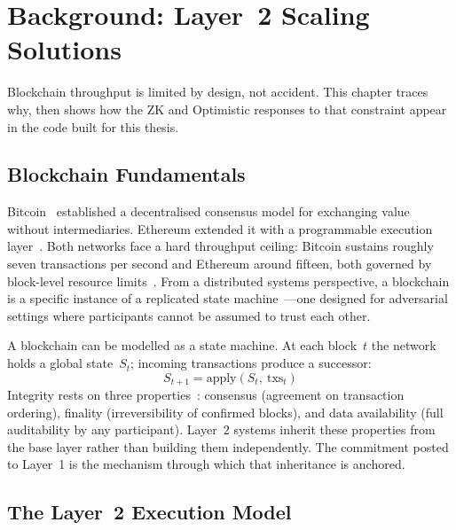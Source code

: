 \chapter{Background: Layer~2 Scaling Solutions}
\label{ch:background}

Blockchain throughput is limited by design, not accident. This chapter traces why, then shows how the ZK and Optimistic responses to that constraint appear in the code built for this thesis.

\section{Blockchain Fundamentals}
\label{sec:fundamentals}

Bitcoin~\cite{nakamoto2008bitcoin} established a decentralised consensus model for exchanging value without intermediaries. Ethereum extended it with a programmable execution layer~\cite{wood2014ethereum}. Both networks face a hard throughput ceiling: Bitcoin sustains roughly seven transactions per second and Ethereum around fifteen, both governed by block-level resource limits~\cite{croman2016scaling}. From a distributed systems perspective, a blockchain is a specific instance of a replicated state machine~\cite{vansteen2023distributed}---one designed for adversarial settings where participants cannot be assumed to trust each other.

A blockchain can be modelled as a state machine. At each block~$t$ the network holds a global state~$S_t$; incoming transactions produce a successor:
\begin{equation}
  S_{t+1} = \text{apply}(S_t,\ \text{txs}_t)
\end{equation}
Integrity rests on three properties~\cite{vansteen2023distributed}: consensus (agreement on transaction ordering), finality (irreversibility of confirmed blocks), and data availability (full auditability by any participant). Layer~2 systems inherit these properties from the base layer rather than building them independently. The commitment posted to Layer~1 is the mechanism through which that inheritance is anchored.

\section{The Layer~2 Execution Model}
\label{sec:l2concept}

